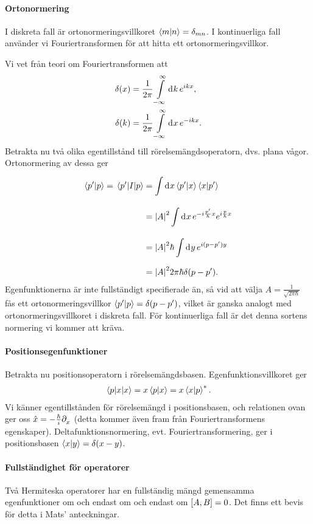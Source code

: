 \paragraph{Ortonormering}
I diskreta fall är ortonormeringsvillkoret $\braket{m}{n} = \delta_{mn}$. I kontinuerliga fall använder vi Fouriertransformen för att hitta ett ortonormeringsvillkor.

Vi vet från teori om Fouriertransformen att
\begin{align*}
	\delta(x) &= \frac{1}{2\pi}\int\limits_{-\infty}^{\infty}\dd[]{k}e^{ikx}, \\
	\delta(k) &= \frac{1}{2\pi}\int\limits_{-\infty}^{\infty}\dd[]{x}e^{-ikx}.
\end{align*}
Betrakta nu två olika egentillstånd till rörelsemängdsoperatorn, dvs. plana vågor. Ortonormering av dessa ger
\begin{align*}
	\braket{p'}{p} = \mel{p'}{I}{p} &= \int\limits_{}^{}\dd[]{x}\braket{p'}{x}\braket{x}{p'} \\
	                                &= \abs{A}^{2}\int\limits_{}^{}\dd[]{x}e^{-i\frac{p'}{\hbar}x}e^{i\frac{p}{\hbar}x} \\
	                                &= \abs{A}^{2}\hbar\int\limits_{}^{}\dd[]{y}e^{i(p - p')y} \\
	                                &= \abs{A}^{2}2\pi\hbar\delta(p - p').
\end{align*}
Egenfunktionerna är inte fullständigt specifierade än, så vid att välja $A = \frac{1}{\sqrt{2\pi\hbar}}$ fås ett ortonormeringsvillkor $\braket{p'}{p} = \delta(p - p')$, vilket är ganska analogt med ortonormeringsvillkoret i diskreta fall. För kontinuerliga fall är det denna sortens normering vi kommer att kräva.

\paragraph{Positionsegenfunktioner}
Betrakta nu positionsoperatorn i rörelsemängdsbasen. Egenfunktionsvillkoret ger
\begin{align*}
	\mel{p}{x}{x} = x\braket{p}{x} = x\braket{x}{p}^{*}.
\end{align*}
Vi känner egentillstånden för rörelsemängd i positionsbasen, och relationen ovan ger oss  $\hat{x} = -\frac{\hbar}{i}\partial_{x}^{}$ (detta kommer även fram från Fouriertransformens egenskaper). Deltafunktionsnormering, evt. Fouriertransformering, ger i positionsbasen $\braket{x}{y} = \delta(x - y)$.

\paragraph{Fullständighet för operatorer}
Två Hermiteska operatorer har en fullständig mängd gemensamma egenfunktioner om och endast om och endast om $[A, B] = 0$. Det finns ett bevis för detta i Mats' anteckningar.

